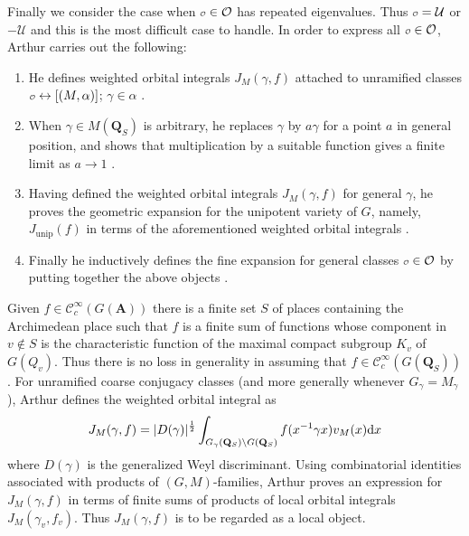\documentclass{ims9x6}
\def\A{\mathbf A}
\def\Q{\mathbf Q}
\def\CCC{\mathcal C}
\def\O{\mathcal O}
\def\o{\scalebox{0.7}{$\scriptstyle\mathcal{O}$}}
\def\UUU{\mathcal U}
\def\d{\text d}
\def\bs{\setminus}
\def\mod#1{\lvert #1 \rvert} %
\begin{document}
Finally we consider the case when $\o \in \O$ has repeated eigenvalues. Thus $\o = \UUU$ or $-\UUU$ and this is the most difficult case to handle. In order to express all $\o \in \O$, Arthur carries out the following:
\begin{enumerate}
	\item He defines weighted orbital integrals $J_M(\gamma, f)$ attached to unramified classes $\o \leftrightarrow [(M, \alpha)]$; $\gamma \in \alpha$ \cite{MR625344}. 
	\item When $\gamma \in M(\Q_S)$ is arbitrary, he replaces $\gamma$ by $a \gamma$ for a point $a$ in general position, and shows that multiplication by a suitable function gives a finite limit as $a \to 1$ \cite{MR932848}.
	\item Having defined the weighted orbital integrals $J_M(\gamma, f)$ for general $\gamma$, he proves the geometric expansion for the unipotent variety of $G$, namely, $J_{\text{unip}}(f)$ in terms of the aforementioned weighted orbital integrals \cite{MR828844}. 
	\item Finally he inductively defines the fine expansion for general classes $\o \in \O$ by putting together the above objects \cite{MR835041}.
\end{enumerate}
Given $f \in \CCC_c^\infty(G(\A))$ there is a finite set $S$ of places containing the Archimedean place such that $f$ is a finite sum of functions whose component in $v \not \in S$ is the characteristic function of the maximal compact subgroup $K_v$ of $G(Q_v)$. Thus there is no loss in generality in assuming that $f \in \CCC_c^\infty(G(\Q_S))$. For unramified coarse conjugacy classes (and more generally whenever $G_\gamma = M_\gamma$), Arthur defines the weighted orbital integral as 
\begin{equation} \label{jm}
	J_M(\gamma, f) = \mod{D(\gamma)}^{\frac{1}{2}} \int_{G_\gamma(\Q_S)\bs G(\Q_S)} f(x^{-1}\gamma x) v_M(x) \d x
\end{equation}
where $D(\gamma)$ is the generalized Weyl discriminant. Using combinatorial identities associated with products of $(G, M)$-families, Arthur proves an expression for $J_M(\gamma, f)$ in terms of finite sums of products of local orbital integrals $J_M(\gamma_v, f_v)$. Thus $J_M(\gamma, f)$ is to be regarded as a local object. 
\end{document}
